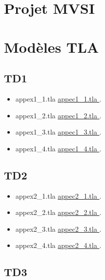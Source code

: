 \documentclass[ 12pt]{article}
\begin{document}
  
  \section{Projet MVSI}
\label{sec:project}


  \section{Modèles TLA}
\label{sec:event-b-models}


\subsection{TD1}

 \begin{itemize}
  \item[]   appex1\_1.tla 
    \href{http://mery54.github.io/teaching/mvsi/models/appex1_1.tla}{
      appec1\_1.tla }.
      \item[]   appex1\_2.tla 
    \href{http://mery54.github.io/teaching/mvsi/models/appex1_2.tla}{
      appec1\_2.tla }.
       \item[]   appex1\_3.tla 
    \href{http://mery54.github.io/teaching/mvsi/models/appex1_3.tla}{
      appec1\_3.tla }.
          \item[]   appex1\_4.tla 
    \href{http://mery54.github.io/teaching/mvsi/models/appex1_4.tla}{
      appec1\_4.tla }.
  \end{itemize}

  
\subsection{TD2}
    
 \begin{itemize}
  \item[]   appex2\_1.tla 
    \href{http://mery54.github.io/teaching/mvsi/models/appex2_1.tla}{
      appec2\_1.tla }.
      \item[]   appex2\_2.tla 
    \href{http://mery54.github.io/teaching/mvsi/models/appex2_2.tla}{
      appec2\_2.tla }.
       \item[]   appex2\_3.tla 
    \href{http://mery54.github.io/teaching/mvsi/models/appex2_3.tla}{
      appec2\_3.tla }.
          \item[]   appex2\_4.tla 
    \href{http://mery54.github.io/teaching/mvsi/models/appex2_4.tla}{
      appec2\_4.tla }.
  \end{itemize}

  
\subsection{TD3}
    
\end{document}
